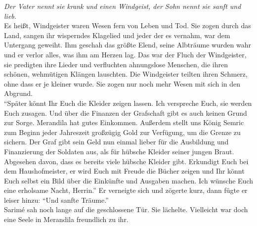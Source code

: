 \textit{Der Vater nennt sie krank und einen Windgeist, der Sohn nennt sie sanft und lieb.}\\
Es heißt, Windgeister waren Wesen fern von Leben und Tod. Sie zogen durch das Land, sangen ihr 
wisperndes Klagelied und jeder der es vernahm, war dem Untergang geweiht. Ihm geschah das größte 
Elend, seine Albträume wurden wahr und er verlor alles, was ihm am Herzen lag. Das war der Fluch 
der Windgeister, sie predigten ihre Lieder und verfluchten ahnungslose Menschen, die ihren schönen, 
wehmütigen Klängen lauschten. Die Windgeister teilten ihren Schmerz, ohne dass er je kleiner wurde. 
Sie zogen nur noch mehr Wesen mit sich in den Abgrund.\\
``Später könnt Ihr Euch die Kleider zeigen lassen. Ich verspreche Euch, sie werden Euch zusagen. 
Und über die Finanzen der Grafschaft gibt es auch keinen Grund zur Sorge. Merandila hat gutes 
Einkommen. Außerdem stellt uns König Semric zum Beginn jeder Jahreszeit großzügig Gold zur 
Verfügung, um die Grenze zu sichern. Der Graf gibt sein Geld nun einmal lieber für die Ausbildung 
und Finanzierung der Soldaten aus, als für hübsche Kleider seiner jungen Braut. Abgesehen davon, 
dass es bereits viele hübsche Kleider gibt. Erkundigt Euch bei dem Haushofmeister, er wird Euch mit 
Freude die Bücher zeigen und Ihr könnt Euch selbst ein Bild über die Einkünfte und Ausgaben machen. 
Ich wünsche Euch eine erholsame Nacht, Herrin.'' Er verneigte sich und zögerte kurz, dann fügte er 
leiser hinzu: ``Und sanfte Träume.''\\
Sarimé sah noch lange auf die geschlossene Tür. Sie lächelte. Vielleicht war doch eine Seele in 
Merandila freundlich zu ihr. \\


